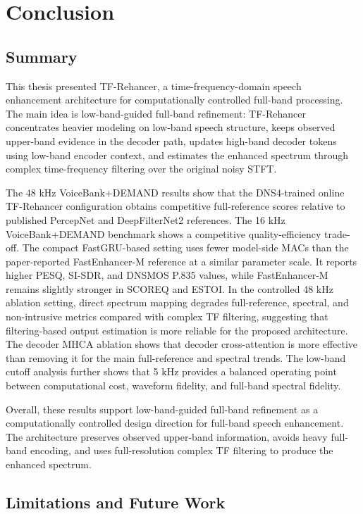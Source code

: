 \chapter{Conclusion}
\label{chap:conclusion}

\section{Summary}
\label{sec:conclusion_summary}

This thesis presented TF-Rehancer, a time-frequency-domain speech enhancement architecture for computationally controlled full-band processing. The main idea is low-band-guided full-band refinement: TF-Rehancer concentrates heavier modeling on low-band speech structure, keeps observed upper-band evidence in the decoder path, updates high-band decoder tokens using low-band encoder context, and estimates the enhanced spectrum through complex time-frequency filtering over the original noisy STFT.

The 48 kHz VoiceBank+DEMAND results show that the DNS4-trained online TF-Rehancer configuration obtains competitive full-reference scores relative to published PercepNet and DeepFilterNet2 references. The 16 kHz VoiceBank+DEMAND benchmark shows a competitive quality-efficiency trade-off. The compact FastGRU-based setting uses fewer model-side MACs than the paper-reported FastEnhancer-M reference at a similar parameter scale. It reports higher PESQ, SI-SDR, and DNSMOS P.835 values, while FastEnhancer-M remains slightly stronger in SCOREQ and ESTOI. In the controlled 48 kHz ablation setting, direct spectrum mapping degrades full-reference, spectral, and non-intrusive metrics compared with complex TF filtering, suggesting that filtering-based output estimation is more reliable for the proposed architecture. The decoder MHCA ablation shows that decoder cross-attention is more effective than removing it for the main full-reference and spectral trends. The low-band cutoff analysis further shows that 5 kHz provides a balanced operating point between computational cost, waveform fidelity, and full-band spectral fidelity.

Overall, these results support low-band-guided full-band refinement as a computationally controlled design direction for full-band speech enhancement. The architecture preserves observed upper-band information, avoids heavy full-band encoding, and uses full-resolution complex TF filtering to produce the enhanced spectrum.

\section{Limitations and Future Work}
\label{sec:conclusion_future}

